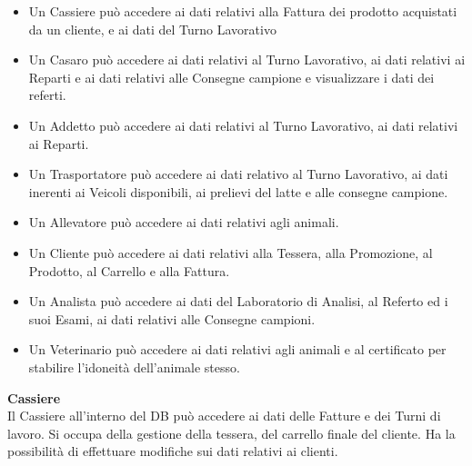 \documentclass[12pt]{report}
\begin{document}
\begin{itemize}
\item {Un Cassiere può accedere ai dati relativi alla Fattura dei prodotto acquistati da un cliente, e ai dati del Turno Lavorativo}
\item {Un Casaro può accedere ai dati relativi al Turno Lavorativo, ai dati relativi ai Reparti e ai dati relativi alle Consegne campione e visualizzare i dati dei referti.}
\item {Un Addetto può accedere ai dati relativi al Turno Lavorativo, ai dati relativi ai Reparti.}
\item {Un Trasportatore può accedere ai dati relativo al Turno Lavorativo, ai dati inerenti ai Veicoli disponibili, ai prelievi del latte e alle consegne campione.}
\item {Un Allevatore può accedere ai dati relativi agli animali.}

\item {Un Cliente può accedere ai dati relativi alla Tessera, alla Promozione, al Prodotto, al Carrello e alla Fattura.}
\item {Un Analista può accedere ai dati del Laboratorio di Analisi, al Referto ed i suoi Esami, ai dati relativi alle Consegne campioni.}
\item {Un Veterinario può accedere ai dati relativi agli animali e al certificato per stabilire l'idoneità dell'animale stesso.}\\
\end{itemize}

\newpage

\textbf{Cassiere}\\
	Il Cassiere all'interno del DB può accedere ai dati delle Fatture e dei Turni di lavoro. Si occupa della gestione della tessera, del carrello finale del cliente. Ha la possibilità di effettuare modifiche sui dati relativi ai clienti.  \\
\end{document}
